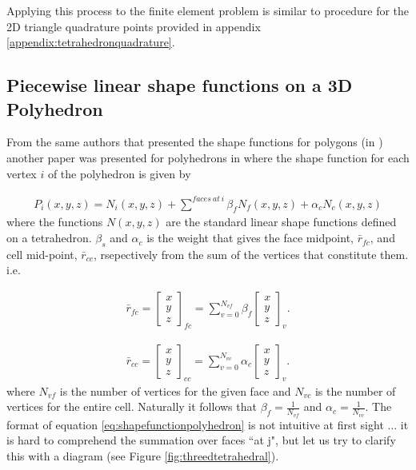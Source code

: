 \documentclass[11pt,letterpaper,titlepage]{article}
\newcommand{\beqn}{\begin{equation}
	\begin{aligned}}
\newcommand{\eeqn}{\end{aligned}
	\end{equation}}
\numberwithin{equation}{section}
\begin{document}
Applying this process to the finite element problem is similar to procedure for the 2D triangle quadrature points provided in appendix \ref{appendix:tetrahedronquadrature}.


\newpage
\subsection{Piecewise linear shape functions on a 3D Polyhedron}
From the same authors that presented the shape functions for polygons (in \cite{BaileyAdamsPWLPolygons}) another paper was presented for polyhedrons in \cite{BaileyAdamsPolyhedral} where the shape function for each vertex $i$ of the polyhedron is given by

\beqn \label{eq:shapefunctionpolyhedron}
P_i(x,y,z) = N_i (x,y,z) +\sum^{faces \ at \ i}  \beta_f N_f(x,y,z) + \alpha_c N_c(x,y,z)
\eeqn 
\newline
where the functions $N(x,y,z)$ are the standard linear shape functions defined on a tetrahedron. $\beta_s$ and $\alpha_c$  is the weight that gives the face midpoint, $\bar{r}_{fc}$, and cell mid-point, $\bar{r}_{cc}$, rsepectively from the sum of the vertices that constitute them. i.e.

\beqn 
\bar{r}_{fc} =
\begin{bmatrix}
x \\ y \\ z
\end{bmatrix}_{fc}
= \sum_{v=0}^{N_{vf}} \beta_f
\begin{bmatrix}
x \\ y \\z
\end{bmatrix}_{v}.
\eeqn

\beqn 
\bar{r}_{cc} =
\begin{bmatrix}
x \\ y \\ z
\end{bmatrix}_{cc}
= \sum_{v=0}^{N_{vc}} \alpha_c
\begin{bmatrix}
x \\ y \\z
\end{bmatrix}_{v}.
\eeqn
\newline
where $N_{vf}$ is the number of vertices for the given face and $N_{vc}$ is the number of vertices for the entire cell. Naturally it follows that $\beta_f = \frac{1}{N_{vf}}$ and $\alpha_c = \frac{1}{N_{vc}}$. The format of equation \ref{eq:shapefunctionpolyhedron} is not intuitive at first sight ... it is hard to comprehend the summation over faces ``at j", but let us try to clarify this with a diagram (see Figure \ref{fig:threedtetrahedral}).
\end{document}
